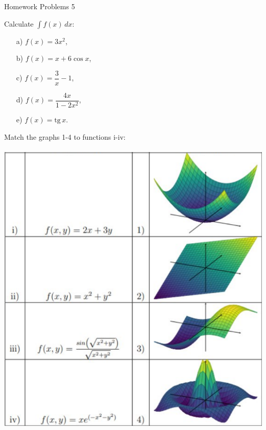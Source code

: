  \begin{center}\begin{large} Homework Problems 5
 \end{large}\end{center}
 \bigskip


\begin{problem}
    Calculate $\displaystyle \int f(x)\, dx$:
    \begin{enumerate}
        \item[a) ] $f(x)=3x^2$,
        \item[b) ] $f(x)=x+6\cos x$,
        \item[c) ] $f(x)=\dfrac{3}{x}-1$,
        \item[d) ] $f(x)=\dfrac{4x}{1-2x^2}$,
        \item[e) ] $f(x)=\text{tg}\,x$.
    \end{enumerate}
\end{problem}



\begin{problem}%
Match the graphs 1-4 to functions i-iv: 
\\~\\
\includegraphics[width=0.6\linewidth]{figs/f(x,y) functions.png}
\\~\\
\end{problem}


